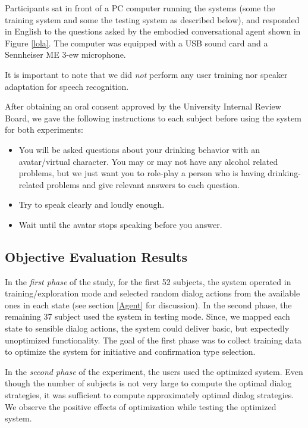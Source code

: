 \begin{sloppy}
Participants sat in front of a PC computer running the systems (some the training system and some the testing system as described below), and responded in English to the questions asked by the embodied conversational agent shown in Figure \ref{lola}.  The computer was equipped with a USB sound card and a Sennheiser ME 3-ew microphone.

It is important to note that we did {\em not} perform any user training nor speaker adaptation for speech recognition. 

After obtaining an oral consent approved by the University Internal Review Board, we gave the following instructions to each subject before using the system for both experiments:
\vspace{-0 mm}
\begin{itemize}
\item You will be asked questions about your drinking behavior with an avatar/virtual character.  You may or may not have any alcohol related problems, but we just want you to role-play a person who is having drinking-related problems and give relevant answers to each question.
\vspace{-0 mm}
\item Try to speak clearly and loudly enough.
\vspace{-0 mm}
\item Wait until the avatar stops speaking before you answer.
\end{itemize} 



\subsection{Objective Evaluation Results}
\label{experiment}
In the {\em first phase} of the study, for the first 52 subjects, the system operated in training/exploration mode and selected random dialog actions from the available ones in each state (see section \ref{Agent} for discussion). In the second phase, the remaining 37 subject used the system in testing mode. Since, we mapped each state to sensible dialog actions, the system could deliver  basic, but expectedly unoptimized functionality. The goal of the first phase was to collect training data to optimize the system for initiative and confirmation type selection. 

In the {\em second phase} of the experiment, the users used the optimized system. Even though the number of subjects is not very large to compute the optimal dialog strategies, it was sufficient to compute approximately optimal dialog strategies. We observe the positive effects of optimization while testing the optimized system. 


\end{sloppy}
